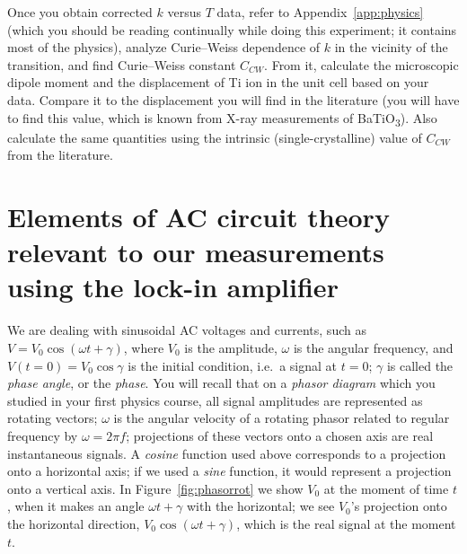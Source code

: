 \documentclass[11pt,a4paper]{article}
\newcommand{\BTO}{BaTiO\textsubscript{3}}
\begin{document}
Once you obtain corrected $k$ versus $T$ data, refer to
Appendix~\ref{app:physics} (which you should be reading continually while doing
this experiment; it contains most of the physics), analyze Curie--Weiss
dependence of $k$ in the vicinity of the transition, and find Curie--Weiss
constant $C_{CW}$. From it, calculate the microscopic dipole moment and the
displacement of Ti ion in the unit cell based on your data. Compare it to the
displacement you will find in the literature (you will have to find this
value, which is known from X-ray measurements of \BTO). Also calculate the same
quantities using the intrinsic (single-crystalline) value of $C_{CW}$ from the
literature.

\clearpage
\appendix
\section{Elements of AC circuit theory relevant to our measurements using the
         lock-in amplifier}\label{app:ac}

We are dealing with sinusoidal AC voltages and currents, such as
$V = V_0\cos(\omega t + \gamma)$, where $V_0$ is the amplitude, $\omega$ is the
angular frequency, and $V(t=0) = V_0\cos\gamma$ is the initial condition, i.e.\
a signal at $t = 0$; $\gamma$ is called the \emph{phase angle}, or the
\emph{phase}. You will recall that on a \emph{phasor diagram} which you studied
in your first physics course, all signal amplitudes are represented as rotating
vectors; $\omega$ is the angular velocity of a rotating phasor related to
regular frequency by $\omega = 2\pi f$; projections of these vectors onto a
chosen axis are real instantaneous signals. A \emph{cosine} function used above
corresponds to a projection onto a horizontal axis; if we used a \emph{sine}
function, it would represent a projection onto a vertical axis. In
Figure~\ref{fig:phasorrot} we show $V_0$ at the moment of time $t$, when it makes
an angle $\omega t + \gamma$ with the horizontal; we see $V_0$'s projection onto
the horizontal direction, $V_0\cos(\omega t + \gamma)$, which is the real signal
at the moment $t$.
\end{document}
